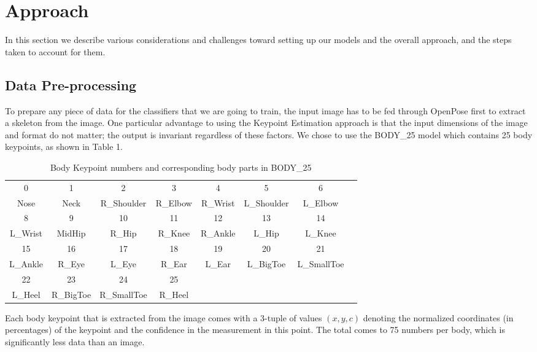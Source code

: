 \documentclass{article}
\begin{document}
\section{Approach}

In this section we describe various considerations and challenges toward setting up our models and the overall approach, and the steps taken to account for them.

\subsection{Data Pre-processing}

To prepare any piece of data for the classifiers that we are going to train, the input image has to be fed through OpenPose first to extract a skeleton from the image. One particular advantage to using the Keypoint Estimation approach is that the input dimensions of the image and format do not matter; the output is invariant regardless of these factors. We chose to use the BODY\_25 model which contains 25 body keypoints, as shown in Table 1.

\begin{table}[h]
	\caption{Body Keypoint numbers and corresponding body parts in BODY\_25}
	\centering
	\begin{tabular}{cccccccc}
	\toprule
	0 & 1 & 2 & 3 & 4 & 5 & 6 \\
	Nose & Neck & R\_Shoulder & R\_Elbow & R\_Wrist & L\_Shoulder & L\_Elbow\\	
	\midrule
	8 & 9 & 10 & 11 & 12 & 13 & 14\\
	L\_Wrist & MidHip & R\_Hip & R\_Knee & R\_Ankle & L\_Hip & L\_Knee\\
	\midrule
	15 & 16 & 17 & 18 & 19 & 20 & 21\\
	L\_Ankle & R\_Eye & L\_Eye & R\_Ear & L\_Ear & L\_BigToe & L\_SmallToe\\
	\midrule
	22 & 23 & 24 & 25\\
	L\_Heel &R\_BigToe & R\_SmallToe & R\_Heel\\
	\midrule
	\end{tabular}
\end{table}

Each body keypoint that is extracted from the image comes with a 3-tuple of values $(x,y,c)$ denoting the normalized coordinates (in percentages) of the keypoint and the confidence in the measurement in this point. The total comes to 75 numbers per body, which is significantly less data than an image.
\end{document}
